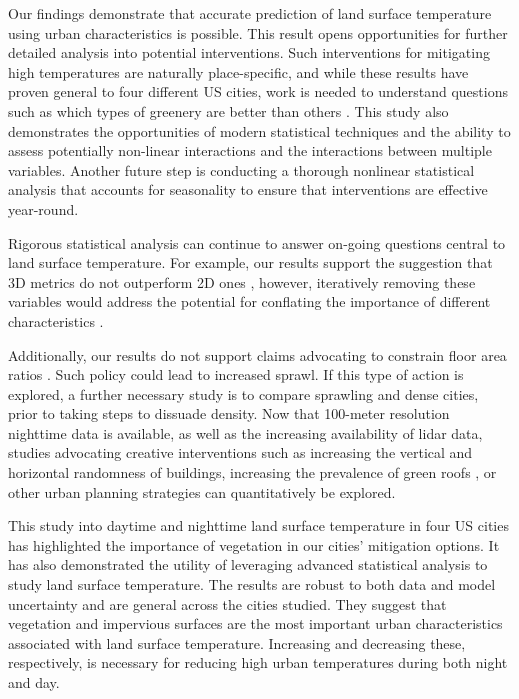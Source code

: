 \documentclass[final,3p,times,twocolumn,sort&compress]{elsarticle}
\begin{document}
Our findings demonstrate that accurate prediction of land surface temperature using urban characteristics is possible.
This result opens opportunities for further detailed analysis into potential interventions.
Such interventions for mitigating high temperatures are naturally place-specific, and while these results have proven general to four different US cities, work is needed to understand questions such as which types of greenery are better than others \cite{Gober2009-im}.
This study also demonstrates the opportunities of modern statistical techniques and the ability to assess potentially non-linear interactions and the interactions between multiple variables. 
Another future step is conducting a thorough nonlinear statistical analysis that accounts for seasonality to ensure that interventions are effective year-round.

Rigorous statistical analysis can continue to answer on-going questions central to land surface temperature.
For example, our results support the suggestion that 3D metrics do not outperform 2D ones \cite{Berger2017-lx}, however, iteratively removing these variables would address the potential for conflating the importance of different characteristics \cite{Chun2017-mm}.

Additionally, our results do not support claims advocating to constrain floor area ratios \cite{Chun2017-mm}.
Such policy could lead to increased sprawl.
If this type of action is explored, a further necessary study is to compare sprawling and dense cities, prior to taking steps to dissuade density. 
Now that 100-meter resolution nighttime data is available, as well as the increasing availability of lidar data, studies advocating creative interventions such as increasing the vertical and horizontal randomness of buildings, increasing the prevalence of green roofs \cite{Gago2013-ta}, or other urban planning strategies can quantitatively be explored.

This study into daytime and nighttime land surface temperature in four US cities has highlighted the importance of vegetation in our cities' mitigation options. 
It has also demonstrated the utility of leveraging advanced statistical analysis to study land surface temperature.
The results are robust to both data and model uncertainty and are general across the cities studied.
They suggest that vegetation and impervious surfaces are the most important urban characteristics associated with land surface temperature.
Increasing and decreasing these, respectively, is necessary for reducing high urban temperatures during both night and day.
\end{document}
